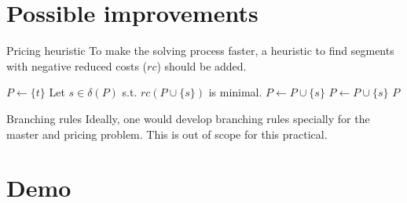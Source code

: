 \documentclass[fleqn]{beamer}
\begin{document}
	\section{Possible improvements}
    \begin{frame}{Pricing heuristic}
        To make the solving process faster,
        a heuristic to find segments with negative reduced costs ($rc$) should be added.
        
        \begin{algorithm}[H]
            \caption{Simple pricing heuristic}
            \begin{algorithmic}[1]
                \State $P\gets\{t\}$
                \State Let $s\in\delta(P)$ s.t. $rc(P\cup\{s\})$ is minimal. \label{nextnode}
                    \State $P\gets P\cup\{s\}$
                    \State {}
                    \State $P\gets P\cup\{s\}$
                    \State {}
                \Else
                    \State \Return $P$
                \EndIf
            \end{algorithmic}
        \end{algorithm}
    \end{frame}

    \begin{frame}{Branching rules}
        Ideally, one would develop branching rules specially for the master and pricing problem.
        This is out of scope for this practical.
    \end{frame}
    
    \section{Demo}
\end{document}
